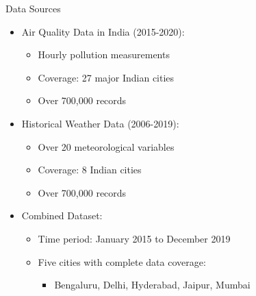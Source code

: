 \documentclass[svgnames, 10pt]{beamer}
\begin{document}
\begin{frame}{Data Sources}
    \begin{itemize}
       \item Air Quality Data in India (2015-2020):
           \begin{itemize}
               \item Hourly pollution measurements
               \item Coverage: 27 major Indian cities
               \item Over 700,000 records
           \end{itemize}
       \vspace{0.5em}
       \item Historical Weather Data (2006-2019):
           \begin{itemize}
               \item Over 20 meteorological variables
               \item Coverage: 8 Indian cities
               \item Over 700,000 records
           \end{itemize}
       \vspace{0.5em}
       \item Combined Dataset:
           \begin{itemize}
               \item Time period: January 2015 to December 2019
               \item Five cities with complete data coverage:
                   \begin{itemize}
                       \item Bengaluru, Delhi, Hyderabad, Jaipur, Mumbai
                   \end{itemize}
           \end{itemize}
    \end{itemize}
    \vfill
\end{frame}
\end{document}
